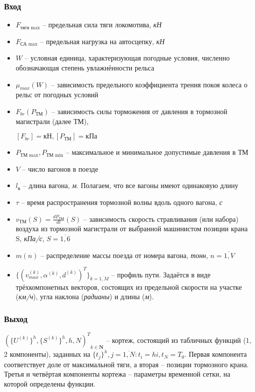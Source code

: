 \subsubsection{Вход}
\begin{itemize}
\item $F_{\text{тяги max}}$ -- предельная сила тяги локомотива, \textit{кН}
\item $F_{\text{СА max}}$ -- предельная нагрузка на автосцепку, \textit{кН}
\item $W$ -- условная единица, характеризующая погодные условия, численно обозначающая степень увлажнённости рельса
\item $\mu_{max}(W)$ -- зависимость предельного коэффициента трения покоя колеса о рельс от погодных условий
\item $F_{br}(P_{\text{ТМ}})$ -- зависимость силы торможения от давления в тормозной магистрали (далее ТМ),

$[F_{br}]=\text{кН}, [P_{\text{ТМ}}]=\text{кПа}$
\item $P_{\text{ТМ max}}, P_{\text{ТМ min}}$ -- максимальное и минимальное допустимые давления в ТМ
\item $V$ -- число вагонов в поезде
\item $l_{\text{в}}$ -- длина вагона, \textit{м}. Полагаем, что все вагоны имеют одинаковую длину
\item $\tau$ -- время распространения тормозной волны вдоль одного вагона,  \textit{с}
\item $v_{\text{ТМ}}(S)=\frac{dP_{ТМ}}{dt}(S)$ -- зависимость скорость стравливания (или набора) воздуха из тормозной магистрали от выбранной машинистом позиции крана S, \textit{кПа/с}, $S=\overline{1,6}$
\item $m(n)$ -- распределение массы поезда от номера вагона, \textit{тонн}, $n=\overline{1, V}$
\item
$\{(v_{max}^{(k)}, \alpha^{(k)}, d^{(k)})^{T}\}_{k=\overline{1, M}}$ -- профиль пути. Задаётся в виде трёхкомпонетных векторов, состоящих из предельной скорости на участке (\textit{км/ч}), угла наклона (\textit{радианы}) и длины (\textit{м}).

\end{itemize}

\subsubsection{Выход}

${(\{U^{(k)}\}^{h}, \{ S^{(k)}\}^{h}, h, N)^{T}}_{k \in \mathbf{N}}$ -- кортеж, состоящий из табличных функций (1,  2 компоненты), заданных на  $\{t_j\}^{h}, j=\overline{1,N}: t_i=hi, t_N=T_0$. Первая компонента соответствует доле от максимальной тяги, а вторая -- позиции тормозного крана. Третья и четвёртая компоненты кортежа -- параметры временной сетки, на которой определены функции. \cite{Coupler}



